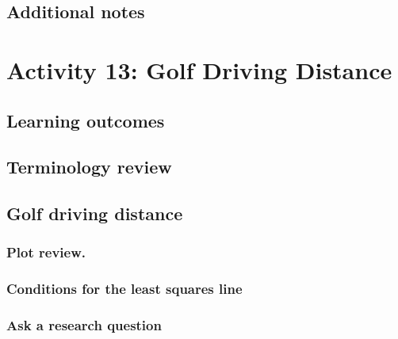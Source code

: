 \documentclass[
]{report}
\begin{document}
\hypertarget{additional-notes-19}{%
\subsection{Additional notes}\label{additional-notes-19}}

\hypertarget{activity-13-golf-driving-distance}{%
\section{Activity 13: Golf Driving Distance}\label{activity-13-golf-driving-distance}}

\hypertarget{learning-outcomes-26}{%
\subsection{Learning outcomes}\label{learning-outcomes-26}}

\hypertarget{terminology-review-22}{%
\subsection{Terminology review}\label{terminology-review-22}}

\hypertarget{golf-driving-distance}{%
\subsection{Golf driving distance}\label{golf-driving-distance}}

\hypertarget{plot-review.}{%
\subsubsection*{Plot review.}\label{plot-review.}}

\hypertarget{conditions-for-the-least-squares-line}{%
\subsubsection*{Conditions for the least squares line}\label{conditions-for-the-least-squares-line}}

\hypertarget{ask-a-research-question-6}{%
\subsubsection*{Ask a research question}\label{ask-a-research-question-6}}
\end{document}
